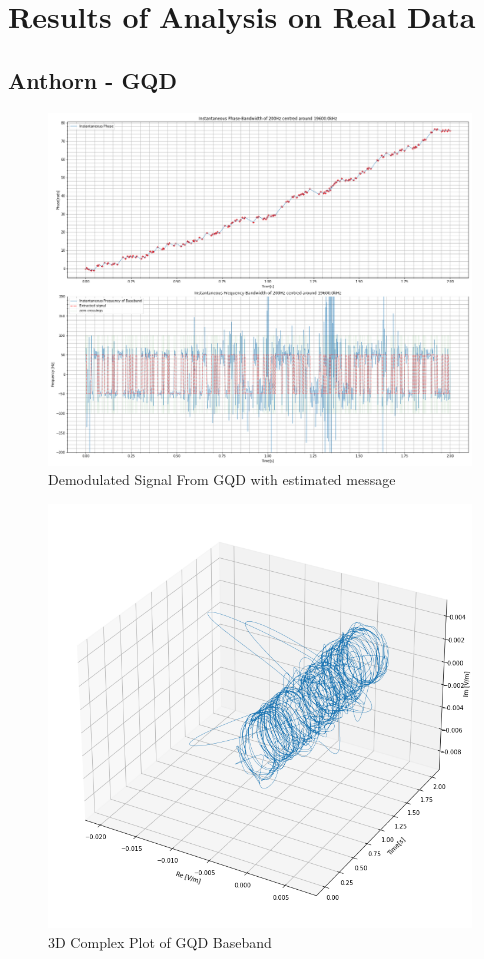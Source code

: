\renewcommand{\thefigure}{A.\arabic{figure}}
\renewcommand{\thesection}{A.\arabic{section}}
\chapter{Results of Analysis on Real Data}
\section{Anthorn - \textbf{GQD}}
\begin{figure}[H]
    \centering
    \includegraphics[width = \textwidth]{figs/AppA/GQD.png}
    \caption{Demodulated Signal From GQD with estimated message}
    \label{fig:my_label}
\end{figure}
\begin{figure}[H]
    \centering
    \includegraphics[width = \textwidth]{figs/AppA/gqd3D.png}
    \caption{3D Complex Plot of GQD Baseband}
    \label{fig:my_label}
\end{figure}

